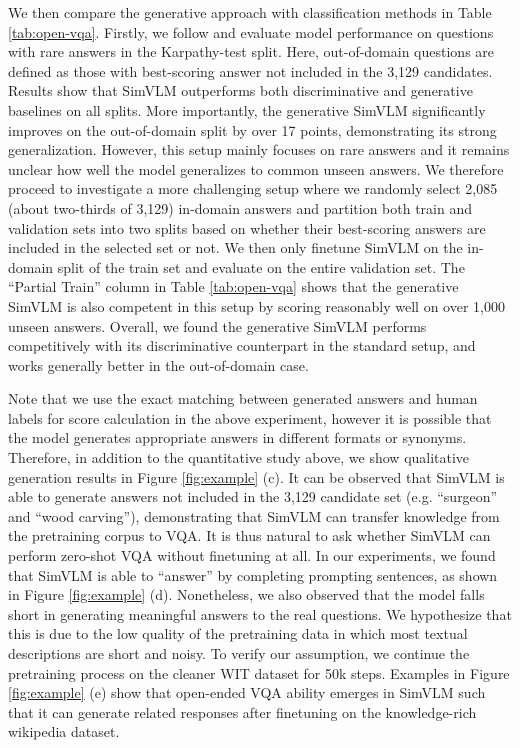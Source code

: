 We then compare the generative approach with classification methods in Table \ref{tab:open-vqa}.
Firstly, we follow \citet{cho2021unifying} and evaluate model performance on questions with rare answers in the Karpathy-test split. Here, out-of-domain questions are defined as those with best-scoring answer not included in the 3,129 candidates. Results show that {SimVLM} outperforms both discriminative and generative baselines on all splits. More importantly, the generative {SimVLM} significantly improves on the out-of-domain split by over 17 points, demonstrating its strong generalization. However, this setup mainly focuses on rare answers and it remains unclear how well the model generalizes to common unseen answers. We therefore proceed to investigate a more challenging setup where we randomly select 2,085 (about two-thirds of 3,129) in-domain answers and partition both train and validation sets into two splits based on whether their best-scoring answers are included in the selected set or not. We then only finetune {SimVLM} on the in-domain split of the train set and evaluate on the entire validation set. The ``Partial Train'' column in Table \ref{tab:open-vqa} shows that the generative {SimVLM} is also competent in this setup by scoring reasonably well on over 1,000 unseen answers. Overall, we found the generative {SimVLM} performs competitively with its discriminative counterpart in the standard setup, and works generally better in the out-of-domain case.

Note that we use the exact matching between generated answers and human labels for score calculation in the above experiment, however it is possible that the model generates appropriate answers in different formats or synonyms. Therefore, in addition to the quantitative study above, we show qualitative generation results in Figure \ref{fig:example} (c). It can be observed that {SimVLM} is able to generate answers not included in the 3,129 candidate set (e.g. ``surgeon'' and ``wood carving''), demonstrating that {SimVLM} can transfer knowledge from the pretraining corpus to VQA. It is thus natural to ask whether {SimVLM} can perform zero-shot VQA without finetuning at all. In our experiments, we found that {SimVLM} is able to ``answer'' by completing prompting sentences, as shown in Figure \ref{fig:example} (d). Nonetheless, we also observed that the model falls short in generating meaningful answers to the real questions. We hypothesize that this is due to the low quality of the pretraining data in which most textual descriptions are short and noisy. To verify our assumption, we continue the pretraining process on the cleaner WIT dataset \citep{srinivasan2021wit} for 50k steps. Examples in Figure \ref{fig:example} (e) show that open-ended VQA ability emerges in {SimVLM} such that it can generate related responses after finetuning on the knowledge-rich wikipedia dataset. 


